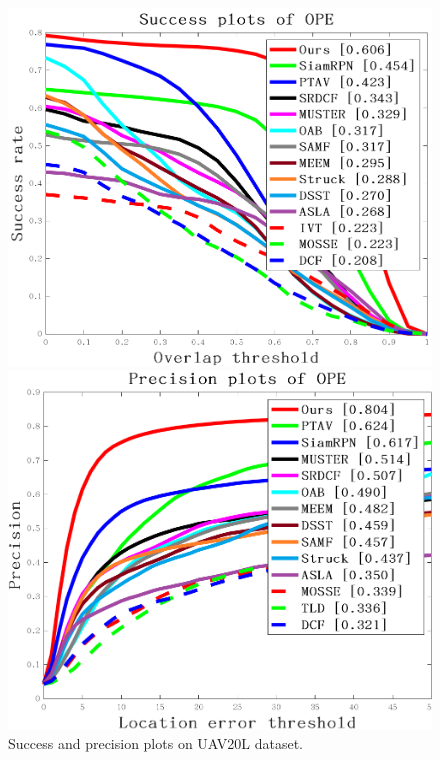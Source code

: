 \begin{figure}[t]
\begin{minipage}[b]{0.5\textwidth}
  \centering
  \centerline{\includegraphics[width=1.0\textwidth]{Img/end/quality_plot_overlap_OPE_AUC.png}}
\end{minipage}
\hfill
\begin{minipage}[b]{0.5\textwidth}
  \centering
  \centerline{\includegraphics[width=1.0\textwidth]{Img/end/quality_plot_error_OPE_threshold.png}}
\end{minipage}
%
\caption{Success and precision plots on UAV20L dataset.}
\label{fig:uav20l}
%
\end{figure}
